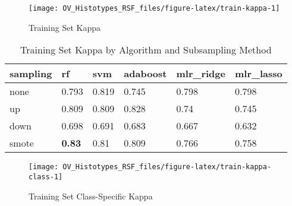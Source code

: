 \documentclass[
]{report}
\begin{document}
\begin{figure}[H]

{\centering \texttt{[image: OV\_Histotypes\_RSF\_files/figure-latex/train-kappa-1]} 

}

\caption{Training Set Kappa}\label{fig:train-kappa}
\end{figure}

\begin{table}

\caption{\label{tab:train-kappa-table}Training Set Kappa by Algorithm and Subsampling Method}
\centering
\begin{tabular}[t]{l|l|l|l|l|l}
\hline
sampling & rf & svm & adaboost & mlr\_ridge & mlr\_lasso\\
\hline
none & 0.793 & 0.819 & 0.745 & 0.798 & 0.798\\
\hline
up & 0.809 & 0.809 & 0.828 & 0.74 & 0.745\\
\hline
down & 0.698 & 0.691 & 0.683 & 0.667 & 0.632\\
\hline
smote & \textbf{0.83} & 0.81 & 0.809 & 0.766 & 0.758\\
\hline
\end{tabular}
\end{table}

\begin{figure}[H]

{\centering \texttt{[image: OV\_Histotypes\_RSF\_files/figure-latex/train-kappa-class-1]} 

}

\caption{Training Set Class-Specific Kappa}\label{fig:train-kappa-class}
\end{figure}
\end{document}
